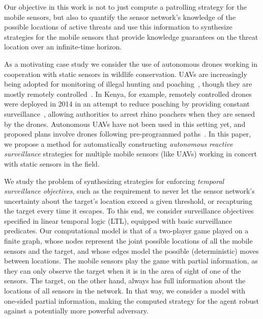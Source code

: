 Our objective in this work  is not to just compute a patrolling strategy for the mobile sensors, but also to quantify the sensor network's knowledge of the possible locations of active threats and use this information to synthesize strategies for the mobile sensors that provide knowledge guarantees on the threat location over an infinite-time horizon.

As a motivating case study we consider the use of autonomous drones working in cooperation with static sensors in wildlife conservation. UAVs are increasingly being adopted for monitoring of illegal hunting and poaching~\cite{schiffman2014drones}, though they are mostly remotely controlled~\cite{mulero2014remotely}. In Kenya, for example, remotely controlled drones were deployed in 2014 in an attempt to reduce poaching  by providing constant surveillance~\cite{Kenya}, allowing authorities to arrest rhino poachers when they are sensed by the drones. Autonomous UAVs  have not been used in this setting yet, and proposed plans involve drones following pre-programmed paths~\cite{Koh12}. In this paper, we propose a method for automatically constructing  \emph{autonomous reactive surveillance} strategies for multiple mobile sensors (like UAVs) working in concert with static sensors in the field. 

We study the problem of synthesizing strategies for enforcing \emph{temporal surveillance objectives}, such as the requirement to never let the sensor network's uncertainty about the target's location exceed a given threshold, or recapturing the target every time it escapes. To this end, we consider surveillance objectives specified in linear temporal logic (LTL), equipped with basic surveillance predicates. Our computational model is that of a two-player game played on a finite graph, whose nodes represent the joint possible locations of all the mobile sensors and the target, and whose edges model the possible (deterministic) moves between locations. The mobile sensors play the game with partial information, as they can only observe the target when  it is in the area of sight of one of the sensors. The target, on the other hand, always has full information about the locations of all sensors in the network. In that way, we consider a model with one-sided partial information, making the computed strategy for the agent robust against a potentially more powerful adversary.


